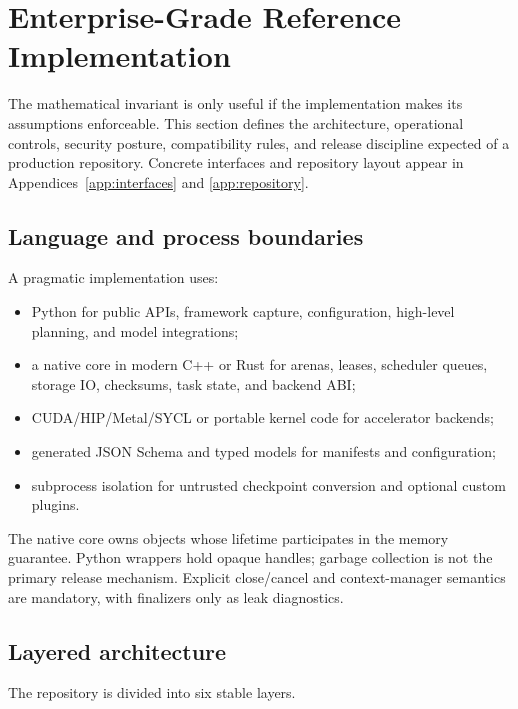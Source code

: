 \section{Enterprise-Grade Reference Implementation}
\label{sec:enterprise}

The mathematical invariant is only useful if the implementation makes its assumptions enforceable. This section defines the architecture, operational controls, security posture, compatibility rules, and release discipline expected of a production repository. Concrete interfaces and repository layout appear in Appendices~\ref{app:interfaces} and \ref{app:repository}.

\subsection{Language and process boundaries}

A pragmatic implementation uses:

\begin{itemize}
  \item Python for public APIs, framework capture, configuration, high-level planning, and model integrations;
  \item a native core in modern C++ or Rust for arenas, leases, scheduler queues, storage IO, checksums, task state, and backend ABI;
  \item CUDA/HIP/Metal/SYCL or portable kernel code for accelerator backends;
  \item generated JSON Schema and typed models for manifests and configuration;
  \item subprocess isolation for untrusted checkpoint conversion and optional custom plugins.
\end{itemize}

The native core owns objects whose lifetime participates in the memory guarantee. Python wrappers hold opaque handles; garbage collection is not the primary release mechanism. Explicit close/cancel and context-manager semantics are mandatory, with finalizers only as leak diagnostics.

\subsection{Layered architecture}

The repository is divided into six stable layers.

